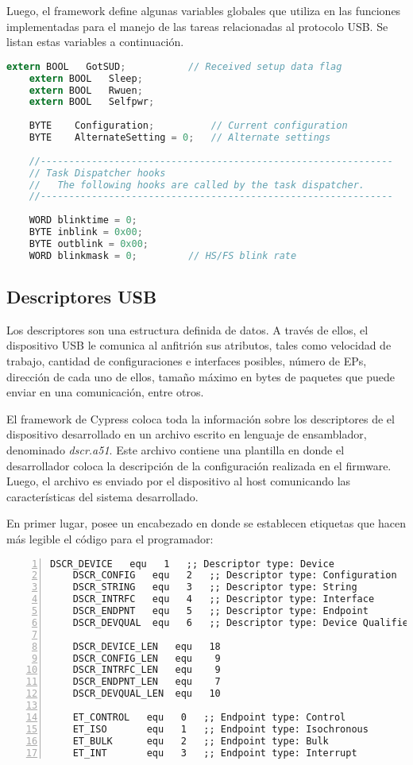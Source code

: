 	Luego, el framework define algunas variables globales que utiliza en las funciones implementadas para el manejo de las tareas relacionadas al protocolo USB. Se listan estas variables a continuación.
	
	\begin{lstlisting}[language=C,backgroundcolor=\color{gray!30}]
	extern BOOL   GotSUD;			// Received setup data flag
	extern BOOL   Sleep;
	extern BOOL   Rwuen;
	extern BOOL   Selfpwr;
	
	BYTE    Configuration;      	// Current configuration
	BYTE    AlternateSetting = 0;   // Alternate settings
	
	//--------------------------------------------------------------
	// Task Dispatcher hooks
	//   The following hooks are called by the task dispatcher.
	//--------------------------------------------------------------
	
	WORD blinktime = 0;
	BYTE inblink = 0x00;
	BYTE outblink = 0x00;
	WORD blinkmask = 0;			// HS/FS blink rate
	\end{lstlisting}
	
\subsection{Descriptores USB}	
	Los descriptores son una estructura definida de datos. A través de ellos, el dispositivo USB le comunica al anfitrión sus atributos, tales como velocidad de trabajo, cantidad de configuraciones e interfaces posibles, número de EPs, dirección de cada uno de ellos, tamaño máximo en bytes de paquetes que puede enviar en una comunicación, entre otros.%
	
	El framework de Cypress coloca toda la información sobre los descriptores de el dispositivo desarrollado en un archivo escrito en lenguaje de ensamblador, denominado {\it dscr.a51}. Este archivo contiene una plantilla en donde el desarrollador coloca la descripción de la configuración realizada en el firmware. Luego, el archivo es enviado por el dispositivo al host comunicando las características del sistema desarrollado.%
	
	En primer lugar, posee un encabezado en donde se establecen etiquetas que hacen más legible el código para el programador:
	\begin{lstlisting}[language={[x86masm]Assembler},backgroundcolor=\color{gray!30},numbers=left]
	DSCR_DEVICE   equ   1   ;; Descriptor type: Device
	DSCR_CONFIG   equ   2   ;; Descriptor type: Configuration
	DSCR_STRING   equ   3   ;; Descriptor type: String
	DSCR_INTRFC   equ   4   ;; Descriptor type: Interface
	DSCR_ENDPNT   equ   5   ;; Descriptor type: Endpoint
	DSCR_DEVQUAL  equ   6   ;; Descriptor type: Device Qualifier
	
	DSCR_DEVICE_LEN   equ   18
	DSCR_CONFIG_LEN   equ    9
	DSCR_INTRFC_LEN   equ    9
	DSCR_ENDPNT_LEN   equ    7
	DSCR_DEVQUAL_LEN  equ   10
	
	ET_CONTROL   equ   0   ;; Endpoint type: Control
	ET_ISO       equ   1   ;; Endpoint type: Isochronous
	ET_BULK      equ   2   ;; Endpoint type: Bulk
	ET_INT       equ   3   ;; Endpoint type: Interrupt
	\end{lstlisting}

